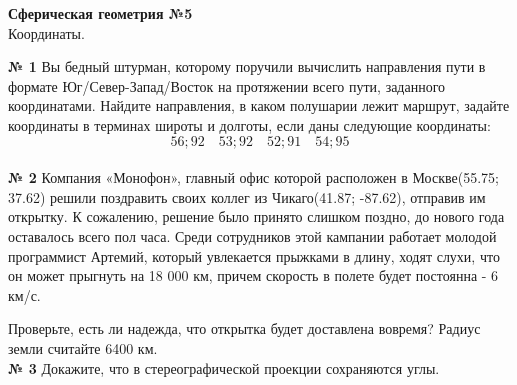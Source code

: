 


    \begin{center}
        \textbf{Сферическая геометрия №5}\\
        Координаты.
    \end{center}


    \textbf{№ 1}
    Вы бедный штурман, которому поручили вычислить направления пути в формате Юг/Север-Запад/Восток
    на протяжении всего пути, заданного координатами.
    Найдите направления, в каком полушарии лежит маршрут, задайте координаты в терминах широты и долготы, если даны следующие координаты:\\
    \[
        56;92 \quad 53;92 \quad 52;91 \quad 54;95
    \]\\


    \textbf{№ 2}
    Компания «Монофон», главный офис которой расположен в Москве(55.75; 37.62)
    решили поздравить своих коллег из Чикаго(41.87; -87.62), отправив им открытку.
    К сожалению, решение было принято слишком поздно, до нового года оставалось всего
    пол часа.
    Среди сотрудников этой кампании работает молодой программист Артемий, который
    увлекается прыжками в длину, ходят слухи, что он может прыгнуть на 18 000 км,
    причем скорость в полете будет постоянна - 6 км/с.

    Проверьте, есть ли надежда, что открытка будет доставлена вовремя?
    Радиус земли считайте 6400 км.\\


    \textbf{№ 3}
    Докажите, что в стереографической проекции сохраняются углы.


